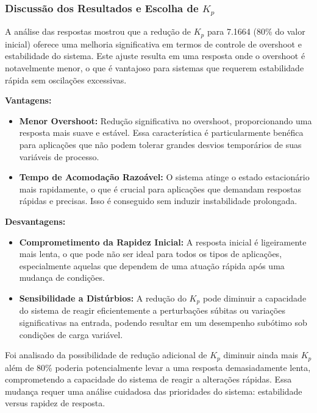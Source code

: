 \subsubsection{Discussão dos Resultados e Escolha de \( K_p \)}
A análise das respostas mostrou que a redução de \( K_p \) para 7.1664 (80\% do valor inicial) oferece uma melhoria significativa em termos de controle de overshoot e estabilidade do sistema. Este ajuste resulta em uma resposta onde o overshoot é notavelmente menor, o que é vantajoso para sistemas que requerem estabilidade rápida sem oscilações excessivas.

\vspace{0.4cm}
\textbf{Vantagens:}
\begin{itemize}
    \item \textbf{Menor Overshoot:} Redução significativa no overshoot, proporcionando uma resposta mais suave e estável. Essa característica é particularmente benéfica para aplicações que não podem tolerar grandes desvios temporários de suas variáveis de processo.
    \item \textbf{Tempo de Acomodação Razoável:} O sistema atinge o estado estacionário mais rapidamente, o que é crucial para aplicações que demandam respostas rápidas e precisas. Isso é conseguido sem induzir instabilidade prolongada.
\end{itemize}

\vspace{0.4cm}
\textbf{Desvantagens:}
\begin{itemize}
    \item \textbf{Comprometimento da Rapidez Inicial:} A resposta inicial é ligeiramente mais lenta, o que pode não ser ideal para todos os tipos de aplicações, especialmente aquelas que dependem de uma atuação rápida após uma mudança de condições.
    \item \textbf{Sensibilidade a Distúrbios:} A redução do \( K_p \) pode diminuir a capacidade do sistema de reagir eficientemente a perturbações súbitas ou variações significativas na entrada, podendo resultar em um desempenho subótimo sob condições de carga variável.
\end{itemize}

Foi analisado da possibilidade de redução adicional de \( K_p \) diminuir ainda mais \( K_p \) além de 80\% poderia potencialmente levar a uma resposta demasiadamente lenta, comprometendo a capacidade do sistema de reagir a alterações rápidas. Essa mudança requer uma análise cuidadosa das prioridades do sistema: estabilidade versus rapidez de resposta.

